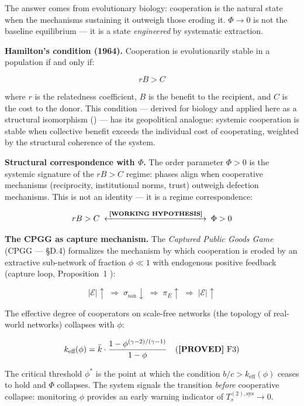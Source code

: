 The answer comes from evolutionary biology: cooperation is the natural
state when the mechanisms sustaining it outweigh those eroding it.
\(\Phi \to 0\) is not the baseline equilibrium --- it is a state
\emph{engineered} by systematic extraction.

\Proved{} \textbf{Hamilton's condition (1964).} Cooperation is
evolutionarily stable in a population if and only if:

\[
rB > C \tag{H}
\]

where \(r\) is the relatedness coefficient, \(B\) is the benefit to
the recipient, and \(C\) is the cost to the donor. This condition ---
derived for biology and applied here as a structural isomorphism
(\Hypoth{}) --- has its geopolitical analogue: systemic cooperation is
stable when collective benefit exceeds the individual cost of cooperating,
weighted by the structural coherence of the system.

\Hypoth{} \textbf{Structural correspondence with \(\Phi\).}
The order parameter \(\Phi > 0\) is the systemic signature of the
\(rB > C\) regime: phases align when cooperative mechanisms
(reciprocity, institutional norms, trust) outweigh defection mechanisms.
This is not an identity --- it is a regime correspondence:

\[
rB > C \;\xleftrightarrow{\;\text{\textnormal{\textbf{[WORKING HYPOTHESIS]}}{}}\;}\; \Phi > 0
\]

\Hypoth{} \textbf{The CPGG as capture mechanism.} The
\textit{Captured Public Goods Game} (CPGG --- §D.4) formalizes the
mechanism by which cooperation is eroded by an extractive sub-network
of fraction \(\phi \ll 1\) with endogenous positive feedback
(capture loop, Proposition~1 \Proved{}):

\[
|\mathcal{E}| \uparrow \;\Rightarrow\; \sigma_{\text{san}} \downarrow \;\Rightarrow\; \pi_E \uparrow \;\Rightarrow\; |\mathcal{E}| \uparrow
\]

The effective degree of cooperators on scale-free networks (the topology
of real-world networks) collapses with \(\phi\):

\[
k_{\text{eff}}(\phi) = \bar{k} \cdot \frac{1 - \phi^{(\gamma-2)/(\gamma-1)}}{1-\phi} \quad (\text{\textnormal{\textbf{[PROVED]}}{} F3})
\]

The critical threshold \(\phi^*\) is the point at which the condition
\(b/c > k_{\text{eff}}(\phi)\) ceases to hold and \(\Phi\) collapses.
The system signals the transition \emph{before} cooperative collapse:
monitoring \(\phi\) provides an early warning indicator of
\(T_s^{(2),\text{sys}} \to 0\).

